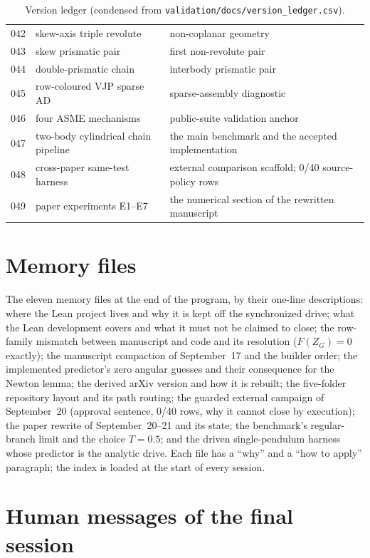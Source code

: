 \begin{table}[t]
\begin{tabular}[t]{@{}p{}p{}p{}@{}}
042 & skew-axis triple revolute & non-coplanar geometry \\
043 & skew prismatic pair & first non-revolute pair \\
044 & double-prismatic chain & interbody prismatic pair \\
045 & row-coloured VJP sparse AD & sparse-assembly diagnostic \\
046 & four ASME mechanisms & public-suite validation anchor \\
047 & two-body cylindrical chain pipeline & the main benchmark and the accepted implementation \\
048 & cross-paper same-test harness & external comparison scaffold; 0/40 source-policy rows \\
049 & paper experiments E1--E7 & the numerical section of the rewritten manuscript \\
\bottomrule
\end{tabular}
\caption{Version ledger (condensed from \texttt{validation/docs/version\_ledger.csv}).}
\label{tab:ledger}
\end{table}

\section{Memory files}
\label{app:memory}

The eleven memory files at the end of the program, by their one-line descriptions: where the Lean
project lives and why it is kept off the synchronized drive; what the Lean development covers and
what it must not be claimed to close; the row-family mismatch between manuscript and code and its
resolution ($F(Z_G)=0$ exactly); the manuscript compaction of September~17 and the builder order;
the implemented predictor's zero angular guesses and their consequence for the Newton lemma; the
derived arXiv version and how it is rebuilt; the five-folder repository layout and its path
routing; the guarded external campaign of September~20 (approval sentence, 0/40 rows, why it
cannot close by execution); the paper rewrite of September~20--21 and its state; the benchmark's
regular-branch limit and the choice $T=0.5$; and the driven single-pendulum harness whose predictor
is the analytic drive. Each file has a ``why'' and a ``how to apply'' paragraph; the index is
loaded at the start of every session.

\section{Human messages of the final session}
\label{app:messages}

